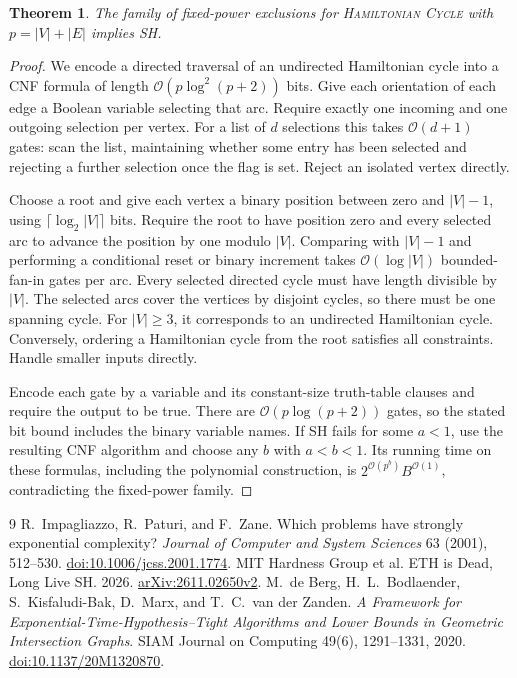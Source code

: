 \documentclass[11pt]{article}
\newtheorem{theorem}{Theorem}
\begin{document}
\hypertarget{hamiltonian-size-sh-converse}{}
\begin{theorem}
The family of fixed-power exclusions for \textsc{Hamiltonian Cycle}
with \(p=|V|+|E|\) implies SH.
\end{theorem}
\begin{proof}
We encode a directed traversal of an undirected Hamiltonian cycle into
a CNF formula of length \(\mathcal O(p\log^2(p+2))\) bits. Give each
orientation of each edge a Boolean variable selecting that arc. Require
exactly one incoming and one outgoing selection per vertex. For a list
of \(d\) selections this takes \(\mathcal O(d+1)\) gates: scan the list,
maintaining whether some entry has been selected and rejecting a further
selection once the flag is set. Reject an isolated vertex directly.

Choose a root and give each vertex a binary position between zero and
\(|V|-1\), using \(\lceil\log_2 |V|\rceil\) bits. Require the root to
have position zero and every selected arc to advance the position by
one modulo \(|V|\). Comparing with \(|V|-1\) and performing a conditional
reset or binary increment takes \(\mathcal O(\log |V|)\) bounded-fan-in
gates per arc. Every selected directed cycle must have length divisible
by \(|V|\). The selected arcs cover the vertices by disjoint cycles, so
there must be one spanning cycle. For \(|V|\ge3\), it corresponds to an
undirected Hamiltonian cycle. Conversely, ordering a Hamiltonian cycle
from the root satisfies all constraints. Handle smaller inputs directly.

Encode each gate by a variable and its constant-size truth-table clauses
and require the output to be true. There are \(\mathcal O(p\log(p+2))\)
gates, so the stated bit bound includes the binary variable names. If SH
fails for some \(a<1\), use the resulting CNF algorithm and choose any
\(b\) with \(a<b<1\). Its running time on these formulas, including the
polynomial construction, is \(2^{\mathcal O(p^b)}B^{\mathcal O(1)}\),
contradicting the fixed-power family.
\end{proof}

\begin{thebibliography}{9}
 R.~Impagliazzo, R.~Paturi, and F.~Zane.
Which problems have strongly exponential complexity?
\emph{Journal of Computer and System Sciences} 63 (2001), 512--530.
\href{https://doi.org/10.1006/jcss.2001.1774}{doi:10.1006/jcss.2001.1774}.
 MIT Hardness Group et al.
ETH is Dead, Long Live SH. 2026.
\href{https://arxiv.org/abs/2611.02650v2}{arXiv:2611.02650v2}.
M.~de Berg, H.~L.~Bodlaender, S.~Kisfaludi-Bak, D.~Marx, and T.~C.~van der Zanden.
\emph{A Framework for Exponential-Time-Hypothesis--Tight Algorithms and Lower Bounds in Geometric Intersection Graphs}.
SIAM Journal on Computing 49(6), 1291--1331, 2020.
\href{https://doi.org/10.1137/20M1320870}{doi:10.1137/20M1320870}.
\end{thebibliography}
\end{document}
